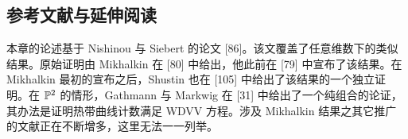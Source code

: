 \subsection{参考文献与延伸阅读}
本章的论述基于 Nishinou 与 Siebert 的论文 [86]。该文覆盖了任意维数下的类似结果。原始证明由 Mikhalkin 在 [80] 中给出，他此前在 [79] 中宣布了该结果。在 Mikhalkin 最初的宣布之后，Shustin 也在 [105] 中给出了该结果的一个独立证明。在 $\mathbb{P}^2$ 的情形，Gathmann 与 Markwig 在 [31] 中给出了一个纯组合的论证，其办法是证明热带曲线计数满足 WDVV 方程。涉及 Mikhalkin 结果之其它推广的文献正在不断增多，这里无法一一列举。
